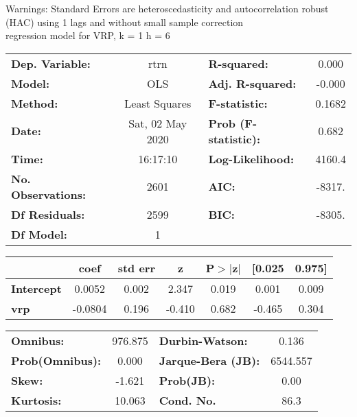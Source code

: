 Warnings: \newline
 [1] Standard Errors are heteroscedasticity and autocorrelation robust (HAC) using 1 lags and without small sample correction\\ 

regression model for VRP, k = 1 h = 6\begin{center}
\begin{tabular}{lclc}
\toprule
\textbf{Dep. Variable:}    &       rtrn       & \textbf{  R-squared:         } &     0.000   \\
\textbf{Model:}            &       OLS        & \textbf{  Adj. R-squared:    } &    -0.000   \\
\textbf{Method:}           &  Least Squares   & \textbf{  F-statistic:       } &    0.1682   \\
\textbf{Date:}             & Sat, 02 May 2020 & \textbf{  Prob (F-statistic):} &    0.682    \\
\textbf{Time:}             &     16:17:10     & \textbf{  Log-Likelihood:    } &    4160.4   \\
\textbf{No. Observations:} &        2601      & \textbf{  AIC:               } &    -8317.   \\
\textbf{Df Residuals:}     &        2599      & \textbf{  BIC:               } &    -8305.   \\
\textbf{Df Model:}         &           1      & \textbf{                     } &             \\
\bottomrule
\end{tabular}
\begin{tabular}{lcccccc}
                   & \textbf{coef} & \textbf{std err} & \textbf{z} & \textbf{P$> |$z$|$} & \textbf{[0.025} & \textbf{0.975]}  \\
\midrule
\textbf{Intercept} &       0.0052  &        0.002     &     2.347  &         0.019        &        0.001    &        0.009     \\
\textbf{vrp}       &      -0.0804  &        0.196     &    -0.410  &         0.682        &       -0.465    &        0.304     \\
\bottomrule
\end{tabular}
\begin{tabular}{lclc}
\textbf{Omnibus:}       & 976.875 & \textbf{  Durbin-Watson:     } &    0.136  \\
\textbf{Prob(Omnibus):} &   0.000 & \textbf{  Jarque-Bera (JB):  } & 6544.557  \\
\textbf{Skew:}          &  -1.621 & \textbf{  Prob(JB):          } &     0.00  \\
\textbf{Kurtosis:}      &  10.063 & \textbf{  Cond. No.          } &     86.3  \\
\bottomrule
\end{tabular}
\end{center}

